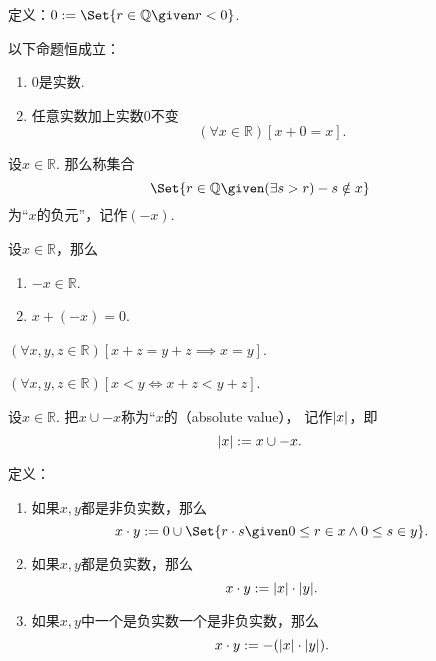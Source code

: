 \begin{definition}
定义：\(0\defeq\Set{ r\in\mathbb{Q} \given r<0 }\).
\end{definition}

\begin{theorem}
以下命题恒成立：
\begin{enumerate}
	\item \(0\)是实数.
	\item 任意实数加上实数\(0\)不变
	\begin{equation}
		(\forall x\in\mathbb{R})[x+0=x].
	\end{equation}
\end{enumerate}
\end{theorem}

\begin{definition}
设\(x\in\mathbb{R}\).
那么称集合\[
	\Set{ r \in \mathbb{Q} \given (\exists s>r) -s \notin x }
\]为“\(x\)的负元”，记作\((-x)\).
\end{definition}

\begin{theorem}
设\(x\in\mathbb{R}\)，那么\begin{enumerate}
	\item \(-x\in\mathbb{R}\).
	\item \(x+(-x)=0\).
\end{enumerate}
\end{theorem}

\begin{corollary}\label{theorem:集合论.实数的消去律}
\((\forall x,y,z\in\mathbb{R})[
	x+z=y+z \implies x=y
]\).
\end{corollary}

\begin{theorem}\label{theorem:集合论.实数的加法的保序性}
\((\forall x,y,z\in\mathbb{R})[
	x<y \iff x+z<y+z
]\).
\end{theorem}

\begin{definition}
设\(x\in\mathbb{R}\).
把\(x \cup -x\)称为“\(x\)的（absolute value），
记作\(\abs{x}\)，即\[
	\abs{x} := x \cup -x.
\]
\end{definition}

\begin{definition}
定义：
\begin{enumerate}
	\item 如果\(x,y\)都是非负实数，那么\[
		x \cdot y
		\defeq
		0 \cup \Set{ r \cdot s \given 0 \leq r \in x \land 0 \leq s \in y }.
	\]

	\item 如果\(x,y\)都是负实数，那么\[
		x \cdot y := \abs{x} \cdot \abs{y}.
	\]

	\item 如果\(x,y\)中一个是负实数一个是非负实数，那么\[
		x \cdot y := -(\abs{x} \cdot \abs{y}).
	\]
\end{enumerate}
\end{definition}

